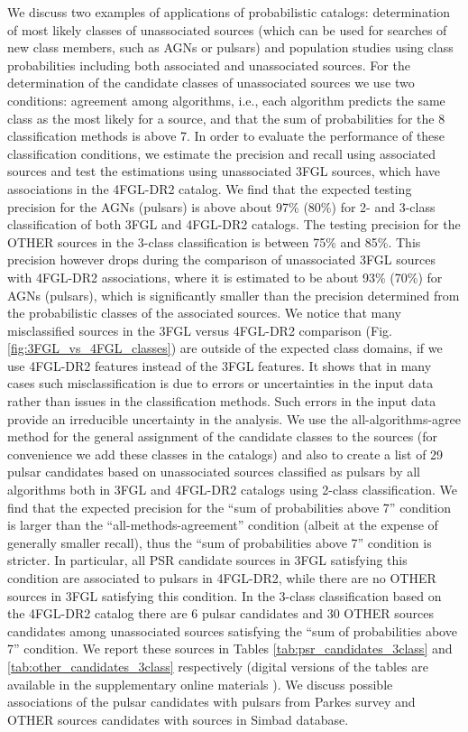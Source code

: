 We discuss two examples of applications of probabilistic catalogs: determination of most likely classes of unassociated sources (which can be used for searches of new class members, such as AGNs or pulsars) and population studies using class probabilities including both associated and unassociated sources.
For the determination of the candidate classes of unassociated sources we use two conditions: agreement among algorithms, i.e., each algorithm predicts the same class as the most likely for a source, and that the sum of probabilities for the 8 classification methods is above 7.
In order to evaluate the performance of these classification conditions, we estimate the precision and recall using associated sources and test the estimations using unassociated 3FGL sources, which have associations in the 4FGL-DR2 catalog.
We find that the expected testing precision for the AGNs (pulsars) is above about 97\% (80\%) for 2- and 3-class classification of both 3FGL and 4FGL-DR2 catalogs. The testing precision for the OTHER sources in the 3-class classification is between 75\% and 85\%.
This precision however drops during the comparison of unassociated 3FGL sources with 4FGL-DR2 associations, where it is estimated to be about 93\% (70\%) for AGNs (pulsars), which is significantly smaller than the precision determined from the probabilistic classes of the associated sources.
We notice that many misclassified sources in the 3FGL versus 4FGL-DR2 comparison (Fig. \ref{fig:3FGL_vs_4FGL_classes}) are outside of the expected class domains, if we use 4FGL-DR2 features instead of the 3FGL features. It shows that in many cases such misclassification is due to errors or uncertainties in the input data rather than issues in the classification methods. Such errors in the input data provide an irreducible uncertainty in the analysis. We use the all-algorithms-agree method for the general assignment of the candidate classes to the sources (for convenience we add these classes in the catalogs) and also to create a list of 29 pulsar candidates based on unassociated sources classified as pulsars by all algorithms both in 3FGL and 4FGL-DR2 catalogs using 2-class classification.
We find that the expected precision for the ``sum of probabilities above 7'' condition is larger than the ``all-methods-agreement'' condition (albeit at the expense of generally smaller recall), thus the ``sum of probabilities above 7'' condition is stricter.
In particular, all PSR candidate sources in 3FGL satisfying this condition are associated to pulsars in 4FGL-DR2, while there are no OTHER sources in 3FGL satisfying this condition. In the 3-class classification based on the 4FGL-DR2 catalog there are 6 pulsar candidates and 30 OTHER sources candidates among unassociated sources satisfying  the ``sum of probabilities above 7'' condition. 
We report these sources in Tables \ref{tab:psr_candidates_3class} and \ref{tab:other_candidates_3class} respectively (digital versions of the tables are available in the supplementary online materials \citep{SOM_material}). We discuss possible associations of the pulsar candidates with pulsars from Parkes survey \citep{Camilo2015} and OTHER sources candidates with sources in Simbad database.


